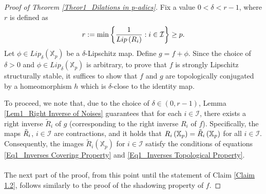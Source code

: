 \documentclass[a4paper, 12pt]{article}
\theoremstyle{definition}
\begin{document}
\begin{proof}[Proof of Theorem \ref{Theor1_Dilations in p-adics}]
		Fix a value $0  < \delta  < r -1 $, where $r$ is defined as  
		\begin{equation}\label{Eq1_Minimum of Lipschitz Constants}
			r :=   \min  \left\{  { 1 \over Lip \left(  R_{i}  \right)  } :    i \in \mathcal{I}  \right\}    \ge    p .
		\end{equation}
		Let $\phi \in Lip_{\delta} \left(  \mathbb{X}_{p}  \right) $ be a $\delta$-Lipschitz map. Define $g = f + \phi$. Since the choice of $\delta  > 0$ and $\phi \in Lip_{\delta} \left(  \mathbb{X}_{p}  \right) $ is arbitrary, to prove that $f$ is strongly Lipschitz structurally stable, it suffices to show that $f$ and $g$ are topologically conjugated by a homeomorphism $h$ which is $\delta$-close to the identity map. 
		
		To proceed, we note that, due to the choice of $  \delta  \in  \left(  0,  r-1  \right) $, Lemma \ref{Lem1_Right Inverse of Noises} guarantees that for each $i\in \mathcal{I}$, there exists a right inverse $\tilde{R}_{i}$ of $g$ (corresponding to the right inverse $R_{i}$ of $f$). 
		Specifically, the maps $\Tilde{R}_{i}$, $i \in \mathcal{I}$ are contractions, and it holds that $R_{i} \left(  \mathbb{X}_{p}  \right)  = \Tilde{R}_{i} \left(  \mathbb{X}_{p}  \right) $ for all $i \in \mathcal{I}$. Consequently, the images $\tilde{R}_{i} \left(  \mathbb{X}_{p}  \right) $ for $i \in \mathcal{I}$ satisfy the conditions of equations \eqref{Eq1_Inverses Covering Property} and \eqref{Eq1_Inverses Topological Property}.  
		
		
		\paragraph{}
		
		The next part of the proof, from this point until the statement of Claim \ref{Claim 1.2}, follows similarly to the proof of the shadowing property of $f$.  
		

\end{proof}
\end{document}

